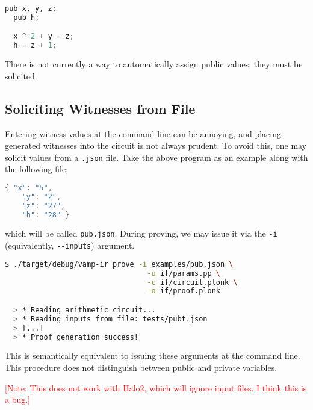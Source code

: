 \begin{lstlisting}[language=Python]
  pub x, y, z;
  pub h;

  x ^ 2 + y = z;
  h = z + 1;
\end{lstlisting}

There is not currently a way to automatically assign public values; they must be solicited. 

\subsection{Soliciting Witnesses from File}

Entering witness values at the command line can be annoying, and placing generated witnesses into the circuit is not always prudent. To avoid this, one may solicit values from a \lstinline|.json| file. Take the above program as an example along with the following file;

\begin{lstlisting}[language=Java]
  { "x": "5",
    "y": "2",
    "z": "27",
    "h": "28" }
\end{lstlisting}

which will be called \lstinline|pub.json|. During proving, we may issue it via the \lstinline|-i| (equivalently, \lstinline|--inputs|) argument.

\begin{lstlisting}[language=bash]
  $ ./target/debug/vamp-ir prove -i examples/pub.json \
                                 -u if/params.pp \
                                 -c if/circuit.plonk \
                                 -o if/proof.plonk

  > * Reading arithmetic circuit...
  > * Reading inputs from file: tests/pubt.json
  > [...]
  > * Proof generation success!
\end{lstlisting}

This is semantically equivalent to issuing these arguments at the command line. This procedure does not distinguish between public and private variables.

\textcolor{red}{[Note: This does not work with Halo2, which will ignore input files. I think this is a bug.]}